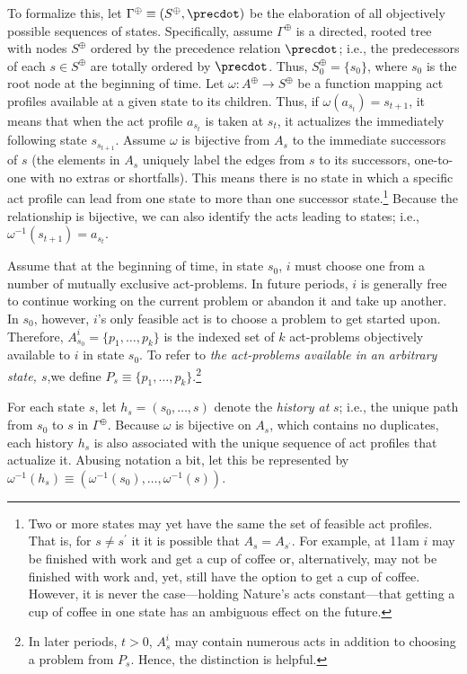 \documentclass[
11pt,
titlepage,
reqno,
]{article}%
\theoremstyle{definition}
\begin{document}
To formalize this,  let $\Gamma^\oplus\equiv( S^\oplus,\precdot)$ be the elaboration of all objectively possible sequences of states.
Specifically, assume $\Gamma^\oplus$ is a directed, rooted tree with nodes $S^\oplus$ ordered by the precedence relation $\precdot$; i.e., the predecessors of each $s\in S^\oplus$ are totally ordered by $\precdot$. 
Thus, $S^\oplus_0=\{s_0\}$, where $s_0$ is the root node at the beginning of time.
Let $\omega:A^\oplus\rightarrow S^\oplus$ be a function mapping act profiles available at a given state to its children.	
Thus, if $\omega(a_{s_t})=s_{t+1}$, it means that when the act profile $a_{s_t}$ is taken at $s_t$, it actualizes the immediately following state $s_{s_{t+1}}$.
Assume $\omega$ is bijective from $A_s$ to the immediate successors of $s$ (the elements in $A_s$ uniquely label the edges from $s$ to its successors, one-to-one with no extras or shortfalls).
This means there is no state in which a specific act profile can lead from one state to more than one successor state.\footnote
{ 
	Two or more states may yet have the same the set of feasible act profiles. That is, for $s\ne s^\prime$ it it is possible that $A_s=A_{s^\prime}$. For example, at 11am $i$ may be finished with  work and get a cup of coffee or, alternatively, may not be finished with work and, yet, still have the option to get a cup of coffee. However, it is never the case---holding Nature's acts constant---that getting a cup of coffee in one state has an ambiguous effect on the future.
}
Because the relationship is bijective, we can also identify the acts leading to states; i.e., $\omega^{-1}(s_{t+1})=a_{s_t}$.

Assume that at the beginning of time, in state $s_0$, $i$ must choose one from  a number of mutually exclusive act-problems.
In future periods, $i$ is generally free to continue working on the current problem or abandon it and take up another. 
In $s_0$, however, $i$'s only feasible act is to choose a problem to get started upon. 
Therefore, $A^i_{s_0}=\{p_1,\ldots,p_k\}$ is the indexed set of $k$ act-problems objectively available to $i$ in state $s_0$.
To refer to \textit{the act-problems available in an arbitrary state, $s$},we define $P_s\equiv \{p_1,\ldots,p_k\}$.\footnote
{
	In later periods, $t>0$, $A^i_s$ may contain numerous acts in addition to choosing a problem from $P_s$. Hence, the distinction is helpful.
}
	
For each state $s$, let $h_s=(s_0,\ldots,s)$ denote the \textit{history at} $s$; i.e., the unique path from $s_0$ to $s$ in $\Gamma^\oplus$.
Because $\omega$ is bijective on $A_s$, which contains no duplicates, each history $h_s$ is also associated with the unique sequence of act profiles that actualize it.
Abusing notation a bit, let this be represented by  $\omega^{-1}(h_s)\equiv(\omega^{-1}(s_0),\ldots,\omega^{-1}(s))$.
\end{document}
